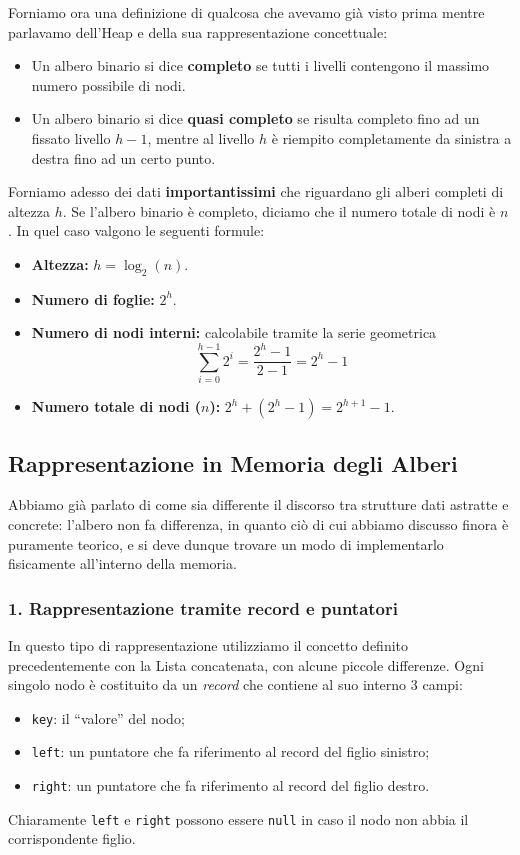 \documentclass[12pt]{report}
\begin{document}
    Forniamo ora una definizione di qualcosa che avevamo già visto prima mentre parlavamo dell'Heap e della sua rappresentazione concettuale:
    \begin{itemize}
    	\item Un albero binario si dice \textbf{completo} se tutti i livelli contengono il massimo numero possibile di nodi.
    	\item Un albero binario si dice \textbf{quasi completo} se risulta completo fino ad un fissato livello $h-1$, mentre al livello $h$ è riempito completamente da sinistra a destra fino ad un certo punto.
    \end{itemize}
    
    Forniamo adesso dei dati \textbf{importantissimi} che riguardano gli alberi completi di altezza $h$. Se l'albero binario è completo, diciamo che il numero totale di nodi è $n$. In quel caso valgono le seguenti formule:
    \begin{itemize}
    	\item \textbf{Altezza:} $h = \log_2(n)$.
    	\item \textbf{Numero di foglie:} $2^h$.
    	\item \textbf{Numero di nodi interni:} calcolabile tramite la serie geometrica
    	\[
    	\sum_{i=0}^{h-1} 2^i = \frac{2^h - 1}{2 - 1} = 2^h - 1
    	\]
    	\item \textbf{Numero totale di nodi ($n$):} $2^h + (2^h - 1) = 2^{h+1} - 1$.
    \end{itemize}
    
    
    \subsection{Rappresentazione in Memoria degli Alberi}
    Abbiamo già parlato di come sia differente il discorso tra strutture dati astratte e concrete: l'albero non fa differenza, in quanto ciò di cui abbiamo discusso finora è puramente teorico, e si deve dunque trovare un modo di implementarlo fisicamente all'interno della memoria.
    
    \subsubsection*{1. Rappresentazione tramite record e puntatori}
    In questo tipo di rappresentazione utilizziamo il concetto definito precedentemente con la Lista concatenata, con alcune piccole differenze. Ogni singolo nodo è costituito da un \textit{record} che contiene al suo interno $3$ campi:
    \begin{itemize}
    	\item \texttt{key}: il ``valore'' del nodo;
    	\item \texttt{left}: un puntatore che fa riferimento al record del figlio sinistro;
    	\item \texttt{right}: un puntatore che fa riferimento al record del figlio destro.
    \end{itemize}
    Chiaramente \texttt{left} e \texttt{right} possono essere \texttt{null} in caso il nodo non abbia il corrispondente figlio.
    
\end{document}
